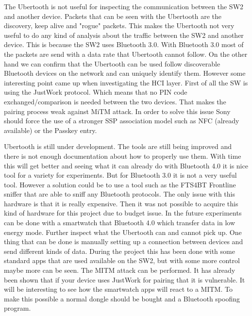 The Ubertooth is not useful for inspecting the communication between the SW2 and another device. Packets that can be seen with the Ubertooth are the discovery, keep alive and  "rogue" packets. This makes the Ubertooth not very useful to do any kind of analysis about the traffic between the SW2 and another device. This is because the SW2 uses Bluetooth 3.0. With Bluetooth 3.0  most of the packets are send with a data rate that Ubertooth cannot follow. On the other hand we can confirm that the Ubertooth can be used follow discoverable Bluetooth devices on the network and can uniquely identify them. \pend 
However some interesting point came up when investigating the HCI layer. First of all the SW is using the JustWork protocol. Which means that no PIN code exchanged/comparison is needed between the two devices. That makes the pairing process weak against MiTM attack. In order to solve this issue Sony should force the use of a stronger SSP association model such as NFC (already available) or the Passkey entry.   

Ubertooth is still under development. The tools are still being improved and there is not enough documentation about how to properly use them. With time this will get better and seeing what it can already do with Bluetooth 4.0 it is nice tool for a variety for experiments. But for Bluetooth 3.0 it is not a very useful tool. However a solution could be to use a tool such as the FTS4BT Frontline sniffer \cite{FTS4BT} that are able to sniff any Bluetooth protocols. The only issue with this hardware is that it is really expensive. Then it was not possible to acquire this kind of hardware for this project due to budget issue.
\pend
In the future experiments can be done with a smartwatch that Bluetooth 4.0 which transfer data in low energy mode.
Further inspect what the Ubertooth can and cannot pick up. One thing that can be done is manually setting up a connection between devices and send different kinds of data. During the project this has been done with some standard apps that are used available on the SW2, but with some more control maybe more can be seen. \pend
The MITM attack can be performed. It has already been shown that if your device uses JustWork for pairing that it is vulnerable. It will be interesting to see how the smartwatch apps will react to a MITM. To make this possible a normal dongle should be bought and a Bluetooth spoofing program.